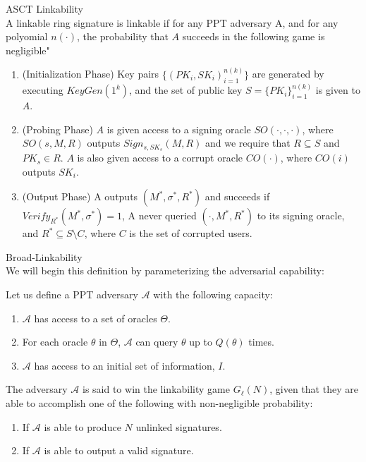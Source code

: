 \documentclass[12pt,titlepage]{article}
\begin{document}
\begin{defn} ASCT Linkability{\\}
A linkable ring signature is linkable if for any PPT adversary A, and for any polyomial $n(\cdot)$, the probability that $A$ succeeds in the following game is negligible"
\begin{enumerate}
\item (Initialization Phase) Key pairs $\{(PK_i,SK_i)_{i = 1}^{n(k)}\}$ are generated by executing $KeyGen(1^k)$, and the set of public key $S = \{PK_i\}_{i = 1}^{n(k)}$ is given to $A$.
\item (Probing Phase) $A$ is given access to a signing oracle $SO(\cdot,\cdot,\cdot)$, where $SO(s,M,R)$ outputs $Sign_{s,SK_s}(M,R)$ and we require that $R \subseteq S$ and $PK_s \in R$. $A$ is also given access to a corrupt oracle $CO(\cdot)$, where $CO(i)$ outputs $SK_i$.
\item (Output Phase) A outputs $(M^*,\sigma^*, R^*)$ and succeeds if $Verify_{R^*}(M^*,\sigma^*) = 1$, A never queried $(\cdot, M^*,R^*)$ to its signing oracle, and $R^* \subseteq S \setminus C$, where $C$ is the set of corrupted users.
\end{enumerate}


\end{defn}

\begin{defn} Broad-Linkability {\\}
We will begin this definition by parameterizing the adversarial capability:

Let us define a PPT adversary $\mathcal{A}$ with the following capacity:
\begin{enumerate}
\item $\mathcal{A}$ has access to a set of oracles $\Theta$.
\item For each oracle $\theta$ in $\Theta$, $\mathcal{A}$ can query $\theta$ up to $Q(\theta)$ times.
\item  $\mathcal{A}$ has access to an initial set of information, $I$.
\end{enumerate}

The adversary $\mathcal{A}$ is said to win the linkability game $G_{\ell}(N)$, given that they are able to accomplish one of the following with non-negligible probability:
\begin{enumerate}
\item If $\mathcal{A}$ is able to produce $N$ unlinked signatures. 
\item If $\mathcal{A}$ is able to output a valid signature.
\end{enumerate}

\end{defn}
\end{document}
